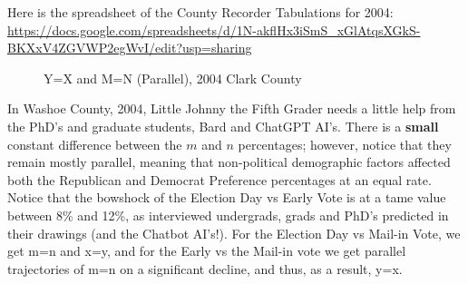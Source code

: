 Here is the spreadsheet of the County Recorder Tabulations for 2004: \url{https://docs.google.com/spreadsheets/d/1N-akflHx3iSmS_xGlAtqsXGkS-BKXxV4ZGVWP2egWvI/edit?usp=sharing}
\begin{figure}[bp!]
\begin{center}
\caption{Y=X and M=N (Parallel), 2004 Clark County}
\noindent{}
\end{center}
\end{figure}

\newpage
In Washoe County, 2004, Little Johnny the Fifth Grader needs a little help from the PhD's and graduate students, Bard and ChatGPT AI's. There is a \textbf{small} constant difference between the $m$ and $n$ percentages; however, notice that they remain mostly parallel, meaning that non-political demographic factors affected both the Republican and Democrat Preference percentages at an equal rate. Notice that the bowshock of the Election Day vs Early Vote is at a tame value between 8\% and 12\%, as interviewed undergrads, grads and PhD's predicted in their drawings (and the Chatbot AI's!). For the Election Day vs Mail-in Vote, we get m=n and x=y, and for the Early vs the Mail-in vote we get parallel trajectories of m=n on a significant decline, and thus, as a result, y=x. 

